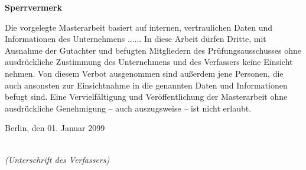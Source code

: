 \thispagestyle{empty}


\vspace*{1cm}

\begin{center}
    \textbf{Sperrvermerk}
\end{center}

\vspace*{1cm}

\noindent 

Die vorgelegte Masterarbeit basiert auf internen, vertraulichen Daten und Informationen des Unternehmens ...... In diese Arbeit dürfen Dritte, mit Ausnahme der Gutachter und befugten Mitgliedern des Prüfungsausschusses ohne ausdrückliche Zustimmung des Unternehmens und des Verfassers keine Einsicht nehmen. Von diesem Verbot ausgenommen sind außerdem jene Personen, die auch ansonsten zur Einsichtnahme in die genannten Daten und Informationen befugt sind. Eine Vervielfältigung und Veröffentlichung der Masterarbeit ohne ausdrückliche Genehmigung – auch auszugsweise – ist nicht erlaubt.

\vspace{2cm}

\noindent
Berlin, den 01. Januar 2099

\vspace{3cm}

\hspace*{7cm}%
\dotfill\\
\hspace*{8.5cm}%
\textit{(Unterschrift des Verfassers)}